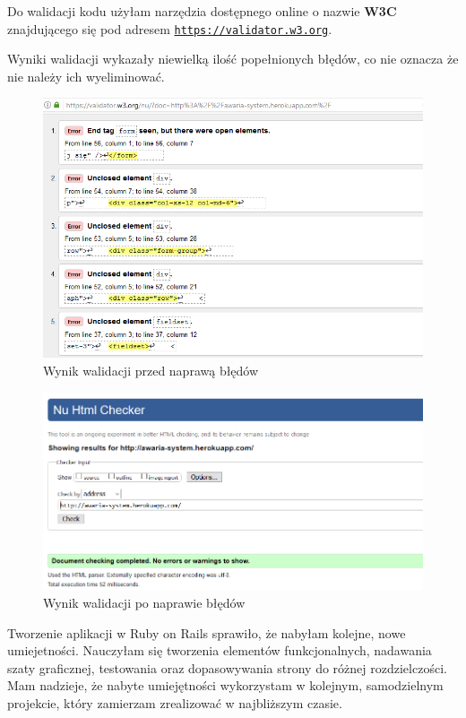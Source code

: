 \documentclass[openright]{xmgr}
\begin{document}
		Do walidacji kodu użyłam narzędzia dostępnego online o nazwie \textbf{W3C} znajdującego się pod adresem \texttt{\url{https://validator.w3.org}}.
	
	Wyniki walidacji wykazały niewielką ilość popełnionych błędów, co nie oznacza że nie należy ich wyeliminować.
	
	\begin{figure}[!tbh]
		\centering
		\includegraphics[width=\linewidth]{image/walidacja}
		\caption{Wynik walidacji przed naprawą błędów}
	\end{figure}
	
	\begin{figure}[!tbh]
		\centering
		\includegraphics[width=\linewidth]{image/validator}
		\caption{Wynik walidacji po naprawie błędów}
	\end{figure}
	
	
	\summary
	Tworzenie aplikacji w Ruby on Rails sprawiło, że nabyłam kolejne, nowe umiejetności.  Nauczyłam się tworzenia elementów funkcjonalnych, nadawania szaty graficznej, testowania oraz dopasowywania strony do różnej rozdzielczości. Mam nadzieje, że nabyte umiejętności wykorzystam w kolejnym, samodzielnym projekcie, który zamierzam zrealizować w najbliższym czasie.   
	
\end{document}
